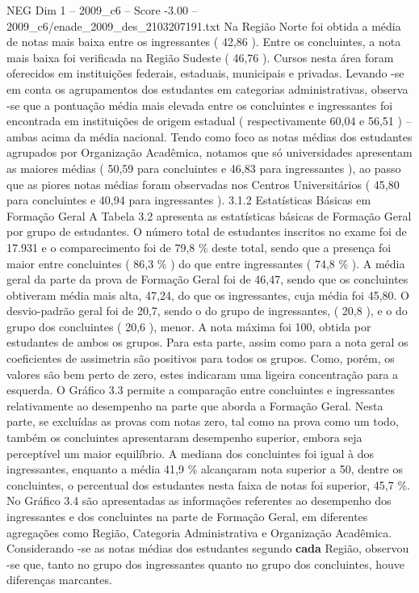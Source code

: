 \begin{textsample}{NEG Dim 1 – 2009\_c6 – Score -3.00 – 2009\_c6/enade\_2009\_des\_2103207191.txt}
Na Região Norte foi obtida a média de notas mais baixa entre os ingressantes ( 42,86 ).
Entre os concluintes, a nota mais baixa foi verificada na Região Sudeste ( 46,76 ).
Cursos nesta área foram oferecidos em instituições federais, estaduais, municipais e privadas.
Levando -se em conta os agrupamentos dos estudantes em categorias administrativas, observa -se que a pontuação média mais elevada entre os concluintes e ingressantes foi encontrada em instituições de origem estadual ( respectivamente 60,04 e 56,51 ) – ambas acima da média nacional.
Tendo como foco as notas médias dos estudantes agrupados por Organização Acadêmica, notamos que só universidades apresentam as maiores médias ( 50,59 para concluintes e 46,83 para ingressantes ), ao passo que as piores notas médias foram observadas nos Centros Universitários ( 45,80 para concluintes e 40,94 para ingressantes ). 3.1.2 Estatísticas Básicas em Formação Geral A Tabela 3.2 apresenta as estatísticas básicas de Formação Geral por grupo de estudantes.
O número total de estudantes inscritos no exame foi de 17.931 e o comparecimento foi de 79,8 \% deste total, sendo que a presença foi maior entre concluintes ( 86,3 \% ) do que entre ingressantes ( 74,8 \% ).
A média geral da parte da prova de Formação Geral foi de 46,47, sendo que os concluintes obtiveram média mais alta, 47,24, do que os ingressantes, cuja média foi 45,80.
O desvio-padrão geral foi de 20,7, sendo o do grupo de ingressantes, ( 20,8 ), e o do grupo dos concluintes ( 20,6 ), menor.
A nota máxima foi 100, obtida por estudantes de ambos os grupos.
Para esta parte, assim como para a nota geral os coeficientes de assimetria são positivos para todos os grupos.
Como, porém, os valores são bem perto de zero, estes indicaram uma ligeira concentração para a esquerda.
O Gráfico 3.3 permite a comparação entre concluintes e ingressantes relativamente ao desempenho na parte que aborda a Formação Geral.
Nesta parte, se excluídas as provas com notas zero, tal como na prova como um todo, também os concluintes apresentaram desempenho superior, embora seja perceptível um maior equilíbrio.
A mediana dos concluintes foi igual à dos ingressantes, enquanto a média 41,9 \% alcançaram nota superior a 50, dentre os concluintes, o percentual dos estudantes nesta faixa de notas foi superior, 45,7 \%.
No Gráfico 3.4 são apresentadas as informações referentes ao desempenho dos ingressantes e dos concluintes na parte de Formação Geral, em diferentes agregações como Região, Categoria Administrativa e Organização Acadêmica.
Considerando -se as notas médias dos estudantes segundo \textbf{cada} Região, observou -se que, tanto no grupo dos ingressantes quanto no grupo dos concluintes, houve diferenças marcantes.

\end{textsample}
